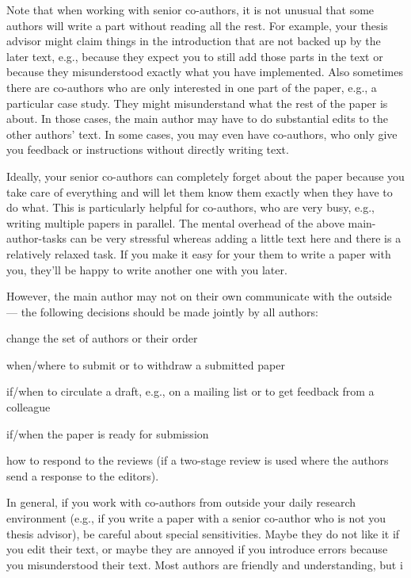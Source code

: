 \documentclass[12pt]{article}
\begin{document}
Note that when working with senior co-authors, it is not unusual that some authors will write a part without reading all the rest.
For example, your thesis advisor might claim things in the introduction that are not backed up by the later text, e.g., because they expect you to still add those parts in the text or because they misunderstood exactly what you have implemented.
Also sometimes there are co-authors who are only interested in one part of the paper, e.g., a particular case study.
They might misunderstand what the rest of the paper is about.
In those cases, the main author may have to do substantial edits to the other authors' text.
In some cases, you may even have co-authors, who only give you feedback or instructions without directly writing text.

Ideally, your senior co-authors can completely forget about the paper because you take care of everything and will let them know them exactly when they have to do what.
This is particularly helpful for co-authors, who are very busy, e.g., writing multiple papers in parallel.
The mental overhead of the above main-author-tasks can be very stressful whereas adding a little text here and there is a relatively relaxed task.
If you make it easy for your them to write a paper with you, they'll be happy to write another one with you later.

However, the main author may not on their own communicate with the outside --- the following decisions should be made jointly by all authors:
\begin{compactitem}
 \item change the set of authors or their order
 \item when/where to submit or to withdraw a submitted paper
 \item if/when to circulate a draft, e.g., on a mailing list or to get feedback from a colleague
 \item if/when the paper is ready for submission
 \item how to respond to the reviews (if a two-stage review is used where the authors send a response to the editors).
\end{compactitem}

In general, if you work with co-authors from outside your daily research environment (e.g., if you write a paper with a senior co-author who is not you thesis advisor), be careful about special sensitivities.
Maybe they do not like it if you edit their text, or maybe they are annoyed if you introduce errors because you misunderstood their text.
Most authors are friendly and understanding, but i
\end{document}
